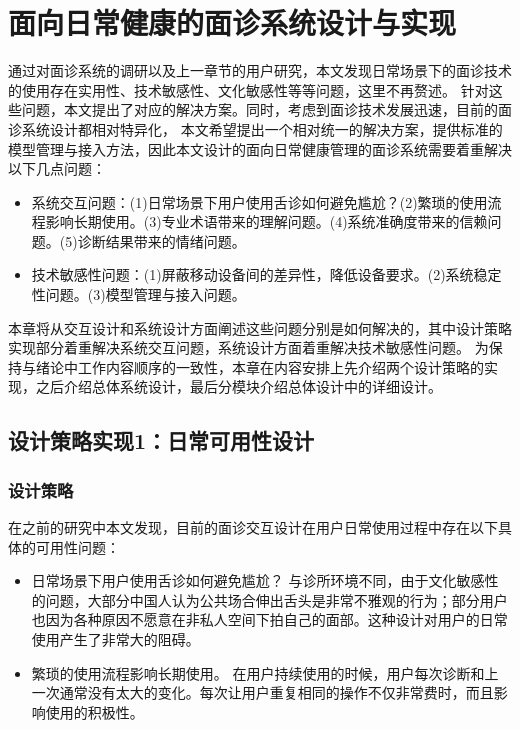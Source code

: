 \chapter{面向日常健康的面诊系统设计与实现}

通过对面诊系统的调研以及上一章节的用户研究，本文发现日常场景下的面诊技术的使用存在实用性、技术敏感性、文化敏感性等等问题，这里不再赘述。
针对这些问题，本文提出了对应的解决方案。同时，考虑到面诊技术发展迅速，目前的面诊系统设计都相对特异化，
本文希望提出一个相对统一的解决方案，提供标准的模型管理与接入方法，因此本文设计的面向日常健康管理的面诊系统需要着重解决以下几点问题：
\begin{itemize}
    \item 系统交互问题：(1)日常场景下用户使用舌诊如何避免尴尬？(2)繁琐的使用流程影响长期使用。(3)专业术语带来的理解问题。(4)系统准确度带来的信赖问题。(5)诊断结果带来的情绪问题。
    \item 技术敏感性问题：(1)屏蔽移动设备间的差异性，降低设备要求。(2)系统稳定性问题。(3)模型管理与接入问题。
\end{itemize}

本章将从交互设计和系统设计方面阐述这些问题分别是如何解决的，其中设计策略实现部分着重解决系统交互问题，系统设计方面着重解决技术敏感性问题。
为保持与绪论中工作内容顺序的一致性，本章在内容安排上先介绍两个设计策略的实现，之后介绍总体系统设计，最后分模块介绍总体设计中的详细设计。

\section{设计策略实现1：日常可用性设计}

\subsection{设计策略}
在之前的研究中本文发现，目前的面诊交互设计在用户日常使用过程中存在以下具体的可用性问题：
\begin{itemize}
    \item 日常场景下用户使用舌诊如何避免尴尬？
    与诊所环境不同，由于文化敏感性的问题，大部分中国人认为公共场合伸出舌头是非常不雅观的行为；部分用户也因为各种原因不愿意在非私人空间下拍自己的面部。这种设计对用户的日常使用产生了非常大的阻碍。
    \item 繁琐的使用流程影响长期使用。
    在用户持续使用的时候，用户每次诊断和上一次通常没有太大的变化。每次让用户重复相同的操作不仅非常费时，而且影响使用的积极性。
\end{itemize}

